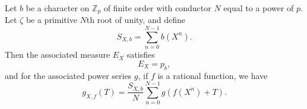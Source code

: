 Let $b$ be a character on $\mathbb{Z}_p$ of finite order with conductor $N$ equal to a power of $p$. Let $\zeta$ be a primitive $N$th root of unity, and define
$$S_{X, b} = \sum_{n=0}^{N-1} b(X^n).$$
Then the associated measure $E_X$ satisfies
$$E_X = p_b,$$
and for the associated power series $g$, if $f$ is a rational function, we have
$$g_{X, f}(T) = \frac{S_{X, b}}{N} \sum_{n=0}^{N-1} g(f(X^n) + T).$$

